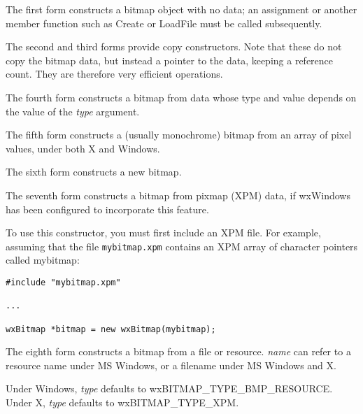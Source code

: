 
The first form constructs a bitmap object with no data; an assignment or another member function such as Create
or LoadFile must be called subsequently.

The second and third forms provide copy constructors. Note that these do not copy the
bitmap data, but instead a pointer to the data, keeping a reference count. They are therefore
very efficient operations.

The fourth form constructs a bitmap from data whose type and value depends on
the value of the {\it type} argument.

The fifth form constructs a (usually monochrome) bitmap from an array of pixel values, under both
X and Windows.

The sixth form constructs a new bitmap.

The seventh form constructs a bitmap from pixmap (XPM) data, if wxWindows has been configured
to incorporate this feature.

To use this constructor, you must first include an XPM file. For
example, assuming that the file {\tt mybitmap.xpm} contains an XPM array
of character pointers called mybitmap:

\begin{verbatim}
#include "mybitmap.xpm"

...

wxBitmap *bitmap = new wxBitmap(mybitmap);
\end{verbatim}

The eighth form constructs a bitmap from a file or resource. {\it name} can refer
to a resource name under MS Windows, or a filename under MS Windows and X.

Under Windows, {\it type} defaults to wxBITMAP\_TYPE\_BMP\_RESOURCE.
Under X, {\it type} defaults to wxBITMAP\_TYPE\_XPM.




